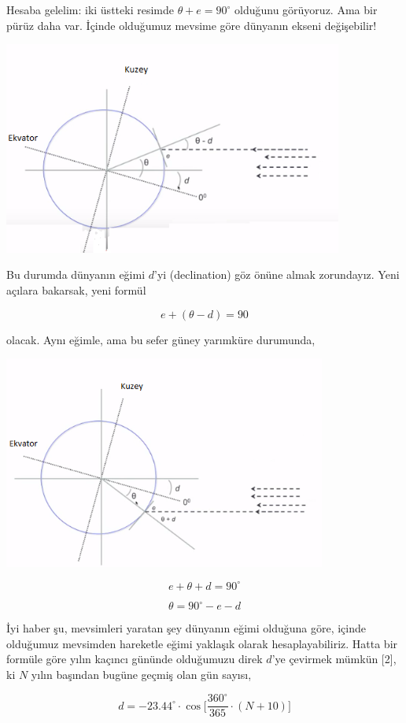 \documentclass[12pt,fleqn]{article}\usepackage{../../common}
\begin{document}
Hesaba gelelim: iki üstteki resimde $\theta + e = 90^\circ$ olduğunu
görüyoruz. Ama bir pürüz daha var. İçinde olduğumuz mevsime göre dünyanın ekseni
değişebilir!

\includegraphics[height=7cm]{geo_07.png}

Bu durumda dünyanın eğimi $d$'yi (declination) göz önüne almak zorundayız. Yeni
açılara bakarsak, yeni formül

$$ e + (\theta - d) = 90 $$

olacak. Aynı eğimle, ama bu sefer güney yarımküre durumunda,

\includegraphics[height=7cm]{geo_06.png}

$$ e + \theta + d = 90^{\circ} $$

$$ \theta = 90^{\circ} - e - d $$

İyi haber şu, mevsimleri yaratan şey dünyanın eğimi olduğuna göre, içinde
olduğumuz mevsimden hareketle eğimi yaklaşık olarak hesaplayabiliriz. Hatta bir
formüle göre yılın kaçıncı gününde olduğumuzu direk $d$'ye çevirmek mümkün [2],
ki $N$ yılın başından bugüne geçmiş olan gün sayısı,

$$
d = -23.44^{\circ} \cdot \cos
\bigg[ \frac{360^{\circ}}{365} \cdot (N + 10) \bigg]
$$
\end{document}
